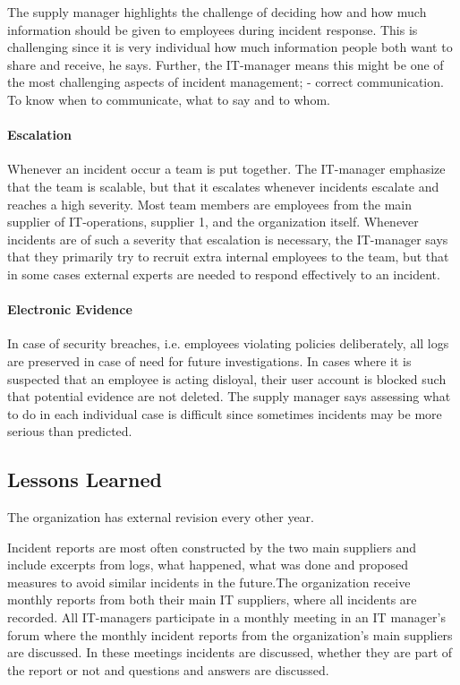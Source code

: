 The supply manager highlights the challenge of deciding how and how much information should be given to employees during incident response. This is challenging since it is very individual how much information people both want to share and receive, he says. Further, the IT-manager means this might be one of the most challenging aspects of incident management; - correct communication. To know when to communicate, what to say and to whom. 

\paragraph{Escalation}
Whenever an incident occur a team is put together. The IT-manager emphasize that the team is scalable, but that it escalates whenever incidents escalate and reaches a high severity. Most team members are employees from the main supplier of IT-operations, supplier 1, and the organization itself. Whenever incidents are of such a severity that escalation is necessary, the IT-manager says that they primarily try to recruit extra internal employees to the team, but that in some cases external experts are needed to respond effectively to an incident.

\paragraph{Electronic Evidence}
In case of security breaches, i.e. employees violating policies deliberately, all logs are preserved in case of need for future investigations. In cases where it is suspected that an employee is acting disloyal, their user account is blocked such that potential evidence are not deleted. The supply manager says assessing what to do in each individual case is difficult since sometimes incidents may be more serious than predicted. 

\subsection{Lessons Learned}
The organization has external revision every other year.

Incident reports are most often constructed by the two main suppliers and include excerpts from logs, what happened, what was done and proposed measures to avoid similar incidents in the future.The organization receive monthly reports from both their main IT suppliers, where all incidents are recorded. All IT-managers participate in a monthly meeting in an IT manager's forum where the monthly incident reports from the organization's main suppliers are discussed. In these meetings incidents are discussed, whether they are part of the report or not and questions and answers are discussed.

